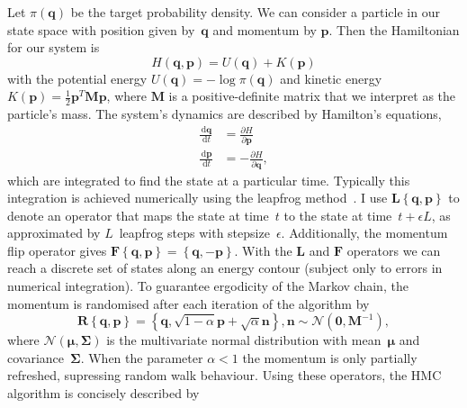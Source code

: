 \documentclass{article}
\newcommand{\dd}{\, \mathrm{d}}
\renewcommand{\vec}[1]{\ensuremath{\boldsymbol{\mathbf{#1}}}}
\newcommand{\mat}[1]{\ensuremath{\boldsymbol{\mathbf{#1}}}}
\newcommand{\op}[1]{\ensuremath{\boldsymbol{\mathbf{#1}}}}
\newcommand{\norm}[1]{\ensuremath{\mathcal{N}\left(#1\right)}}
\begin{document}
    Let $\pi\left(\vec{q}\right)$ be the target probability density.
    We can consider a particle in our state space with position given
        by~$\vec{q}$ and momentum by $\vec{p}$.
    Then the Hamiltonian for our system is
        \begin{equation}
            H\left(\vec{q},\vec{p}\right)
            = U\left(\vec{q}\right) + K\left(\vec{p}\right)
        \end{equation}
        with the potential energy
        $U\left(\vec{q}\right) = -\log{\pi\left(\vec{q}\right)}$ and kinetic
        energy $K\left(\vec{p}\right) = \frac{1}{2} \vec{p}^T \mat{M} \vec{p}$,
        where $\mat{M}$ is a positive-definite matrix that we interpret as
        the particle's mass.
    The system's dynamics are described by Hamilton's equations,
        \begin{align}
            \frac{\dd \vec{q}}{\dd t} &= \frac{\partial H}{\partial \vec{p}} \\
            \frac{\dd \vec{p}}{\dd t} &= -\frac{\partial H}{\partial \vec{q}},
        \end{align}
        which are integrated to find the state at a particular time.
    Typically this integration is achieved numerically using the leapfrog
        method~\cite{Nea11}.
    I use $\op{L}\left\{\vec{q},\vec{p}\right\}$ to denote an operator that
        maps the state at time~$t$ to the state at time~$t + \epsilon L$, as
        approximated by $L$~leapfrog steps with stepsize~$\epsilon$.
    Additionally, the momentum flip operator gives
        $\op{F}\left\{\vec{q},\vec{p}\right\}
         = \left\{\vec{q},-\vec{p}\right\}$.
    With the $\op{L}$ and $\op{F}$ operators we can reach a discrete set of
        states along an energy contour (subject only to errors in numerical
        integration).
    To guarantee ergodicity of the Markov chain, the momentum is randomised
        after each iteration of the algorithm by
        \begin{equation}
            \op{R}\left\{\vec{q},\vec{p}\right\} =
            \left\{\vec{q}, \sqrt{1-\alpha}\vec{p} + \sqrt{\alpha}\vec{n}\right\},
            \vec{n} \sim \norm{\vec{0}, \mat{M}^{-1}},
        \end{equation}
        where $\norm{\vec{\mu},\mat{\Sigma}}$ is the multivariate
        normal distribution with mean~$\vec{\mu}$ and covariance~$\mat{\Sigma}$.
    When the parameter $\alpha < 1$ the momentum is only partially refreshed,
        supressing random walk behaviour.
    Using these operators, the \ac{HMC} algorithm is concisely described by
\end{document}
